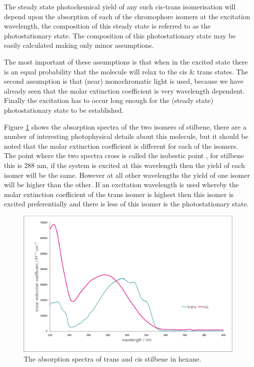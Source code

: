 \documentclass[
]{book}
\begin{document}
The steady state photochemical yield of any such cis-trans isomerisation will depend upon the absorption of each of the chromophore isomers at the excitation wavelength, the composition of this steady state is referred to as the photostationary state. The composition of this photostationary state may be easily calculated making only minor assumptions.

The most important of these assumptions is that when in the excited state there is an equal probability that the molecule will relax to the cis \& trans states. The second assumption is that (near) monochromatic light is used, because we have already seen that the molar extinction coefficient is very wavelength dependent. Finally the excitation has to occur long enough for the (steady state) photostationary state to be established.

Figure \ref{fig:cistransstilbene} shows the absorption spectra of the two isomers of stilbene, there are a number of interesting photophysical details about this molecule, but it should be noted that the molar extinction coefficient is different for each of the isomers. The point where the two spectra cross is called the isobestic point , for stilbene this is 288 nm, if the system is excited at this wavelength then the yield of each isomer will be the same. However at all other wavelengths the yield of one isomer will be higher than the other. If an excitation wavelength is used whereby the molar extinction coefficient of the trans isomer is highest then this isomer is excited preferentially and there is less of this isomer is the photostationary state.

\begin{figure}

{\centering \includegraphics[width=0.6\linewidth]{images/cistransstilbene} 

}

\caption{The absorption spectra of trans and cis stilbene in hexane.}\label{fig:cistransstilbene}
\end{figure}
\end{document}
